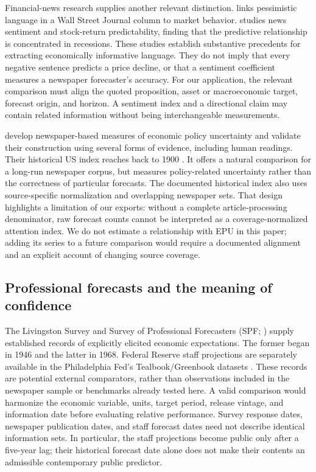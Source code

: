 \documentclass[iicol,pdflatex,sn-mathphys-num]{sn-jnl}
\begin{document}
Financial-news research supplies another relevant distinction. \citet{tetlock2007} links pessimistic language in a Wall Street Journal column to market behavior. \citet{garcia2013} studies news sentiment and stock-return predictability, finding that the predictive relationship is concentrated in recessions. These studies establish substantive precedents for extracting economically informative language. They do not imply that every negative sentence predicts a price decline, or that a sentiment coefficient measures a newspaper forecaster's accuracy. For our application, the relevant comparison must align the quoted proposition, asset or macroeconomic target, forecast origin, and horizon. A sentiment index and a directional claim may contain related information without being interchangeable measurements.

\citet{baker2016} develop newspaper-based measures of economic policy uncertainty and validate their construction using several forms of evidence, including human readings. Their historical US index reaches back to 1900 \citep{bakerhistorical}. It offers a natural comparison for a long-run newspaper corpus, but measures policy-related uncertainty rather than the correctness of particular forecasts. The documented historical index also uses source-specific normalization and overlapping newspaper sets. That design highlights a limitation of our exports: without a complete article-processing denominator, raw forecast counts cannot be interpreted as a coverage-normalized attention index. We do not estimate a relationship with EPU in this paper; adding its series to a future comparison would require a documented alignment and an explicit account of changing source coverage.

\subsection{Professional forecasts and the meaning of confidence}
The Livingston Survey \citep{philalivingston} and Survey of Professional Forecasters (SPF; \citealp{philaspf}) supply established records of explicitly elicited economic expectations. The former began in 1946 and the latter in 1968. Federal Reserve staff projections are separately available in the Philadelphia Fed's Tealbook/Greenbook datasets \citep{philagreenbook}. These records are potential external comparators, rather than observations included in the newspaper sample or benchmarks already tested here. A valid comparison would harmonize the economic variable, units, target period, release vintage, and information date before evaluating relative performance. Survey response dates, newspaper publication dates, and staff forecast dates need not describe identical information sets. In particular, the staff projections become public only after a five-year lag; their historical forecast date alone does not make their contents an admissible contemporary public predictor.
\end{document}
